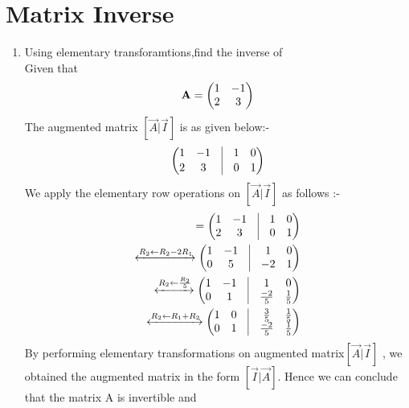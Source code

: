 \documentclass[journal,12pt,twocolumn]{IEEEtran}
\renewcommand\thesection{\arabic{section}}
\begin{document}
\section{Matrix Inverse}
\renewcommand{\theequation}{\theenumi}
\begin{enumerate}[label=\thesection.\arabic*.,ref=\thesection.\theenumi]
\item Using elementary transforamtions,find the inverse of   
\\
  \solution
   Given that
    \begin{align}
    \mathbf{A} = \begin{pmatrix} 1 & -1 \\ 2 & 3\end{pmatrix}
    \end{align}
    The augmented matrix $ [\vec{A} | \vec{I}]$ is as given below:- 
    \begin{align}
	    \myvec{1 & -1 & \vrule & 1 & 0 \\[1 pt]  2 & 3 & \vrule & 0 & 1}
    \end{align}
    We apply the elementary row operations on $ [\vec{A} | \vec{I}]$ as follows :-
    \begin{align}
    [\vec{A} | \vec{I}] = \myvec{1 & -1 & \vrule & 1 & 0 \\ 2 & 3 & \vrule & 0 & 1}
    \\
    \xleftrightarrow{R_2\leftarrow R_2-2R_1}   
    \myvec{1 & -1 & \vrule & 1 & 0 \\ 0 & 5 & \vrule & -2 & 1}
    \\
    \xleftrightarrow{R_2\leftarrow \frac{R_2}{5}}
    \myvec{1 & -1 & \vrule & 1 & 0 \\ 0 & 1 & \vrule & \frac {-2}{5} & \frac {1}{5}}
    \\
    \xleftrightarrow{R_2\leftarrow R_1+R_2}
    \myvec{1 & 0 & \vrule & \frac{3}{5} & \frac{1}{5}  \\ 0 & 1 & \vrule & \frac{-2}{5} & \frac{1}{5}}
    \end{align}
    By performing elementary transformations on augmented matrix$ [\vec{A} | \vec{I}]$ , we obtained the augmented matrix in the form $ [\vec{I} | \vec{A}]$. 
    Hence we can conclude that the matrix A is invertible and 
    \begin{align}

\end{align}
\end{enumerate}
\end{document}
